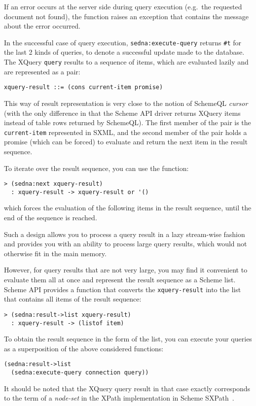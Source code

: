 \documentclass[a4paper,12pt]{article}
\begin{document}
If an error occurs at the server side during query execution (e.g.\ the
requested document not found), the function raises an exception that contains
the message about the error occurred.

In the successful case of query execution, \texttt{sedna:execute-query} returns
\texttt{\#t} for the last 2 kinds of queries, to denote a successful update
made to the database.
The XQuery \texttt{query} results to a sequence of items, which are evaluated
lazily and are represented as a pair:
\begin{verbatim}xquery-result ::= (cons current-item promise)\end{verbatim}
This way of result representation is very close to the notion of SchemeQL
{\em cursor}~\cite{paper:scheme-ql} (with the only difference in that the Scheme API driver returns XQuery items instead of table rows returned by
SchemeQL).
The first member of the pair is the \texttt{current-item} represented in SXML,
and the second member of the pair holds a promise (which can be forced) to
evaluate and return the next item in the result sequence.

To iterate over the result sequence, you can use the function:
\begin{verbatim}> (sedna:next xquery-result)
  : xquery-result -> xquery-result or '()\end{verbatim}
which forces the evaluation of the following items in the result sequence,
until the end of the sequence is reached.

Such a design allows you to process a query result in a lazy stream-wise
fashion and provides you with an ability to process large query results, which
would not otherwise fit in the main memory.

However, for query results that are not very large, you may find it convenient
to evaluate them all at once and represent the result sequence as a Scheme
list.
Scheme API provides a function that converts the \texttt{xquery-result}
into the list that contains all items of the result sequence:
\begin{verbatim}> (sedna:result->list xquery-result)
  : xquery-result -> (listof item)\end{verbatim}

To obtain the result sequence in the form of the list, you can execute your
queries as a superposition of the above considered functions:
\begin{verbatim}(sedna:result->list
  (sedna:execute-query connection query))\end{verbatim}
It should be noted that the XQuery query result in that case exactly
corresponds to the term of a {\em node-set} in the XPath implementation in
Scheme SXPath~\cite{paper:sxpath}.
\end{document}
